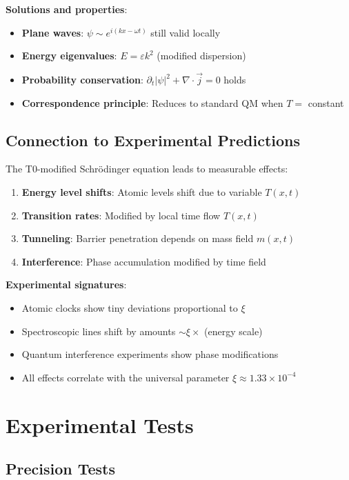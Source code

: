 \documentclass[12pt,a4paper]{article}
\newcommand{\xipar}{\xi}
\theoremstyle{definition}
\theoremstyle{remark}
\begin{document}
	\textbf{Solutions and properties}:
	\begin{itemize}
		\item \textbf{Plane waves}: $\psi \sim e^{i(kx - \omega t)}$ still valid locally
		\item \textbf{Energy eigenvalues}: $E = \varepsilon k^2$ (modified dispersion)
		\item \textbf{Probability conservation}: $\partial_t|\psi|^2 + \nabla \cdot \vec{j} = 0$ holds
		\item \textbf{Correspondence principle}: Reduces to standard QM when $T = $ constant
	\end{itemize}
	
	\subsection{Connection to Experimental Predictions}
	
	The T0-modified Schrödinger equation leads to measurable effects:
	
	\begin{enumerate}
		\item \textbf{Energy level shifts}: Atomic levels shift due to variable $T(x,t)$
		\item \textbf{Transition rates}: Modified by local time flow $T(x,t)$
		\item \textbf{Tunneling}: Barrier penetration depends on mass field $m(x,t)$
		\item \textbf{Interference}: Phase accumulation modified by time field
	\end{enumerate}
	
	\textbf{Experimental signatures}:
	\begin{itemize}
		\item Atomic clocks show tiny deviations proportional to $\xipar$
		\item Spectroscopic lines shift by amounts $\sim \xipar \times$ (energy scale)
		\item Quantum interference experiments show phase modifications
		\item All effects correlate with the universal parameter $\xipar \approx 1.33 \times 10^{-4}$
	\end{itemize}
	
	\section{Experimental Tests}
	
	\subsection{Precision Tests}
	
\end{document}
